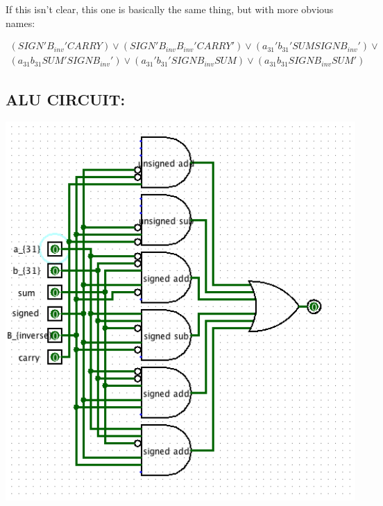 \documentclass[a4paper]{article}
\begin{document}
If this isn't clear, this one is basically the same thing, but with more obvious names:

\begin{eqnarray*}
(SIGN' B_{inv}' CARRY) \vee (SIGN' B_{inv} B_{inv}' CARRY') \vee (a_{31}' b_{31}' SUM SIGN B_{inv}') \vee \\
(a_{31} b_{31} SUM' SIGN B_{inv}') \vee (a_{31}' b_{31}' SIGN B_{inv} SUM) \vee (a_{31} b_{31} SIGN B_{inv} SUM')
\end{eqnarray*}

\subsection*{ALU CIRCUIT:}

\includegraphics[width=150mm]{alu.png}
\end{document}
